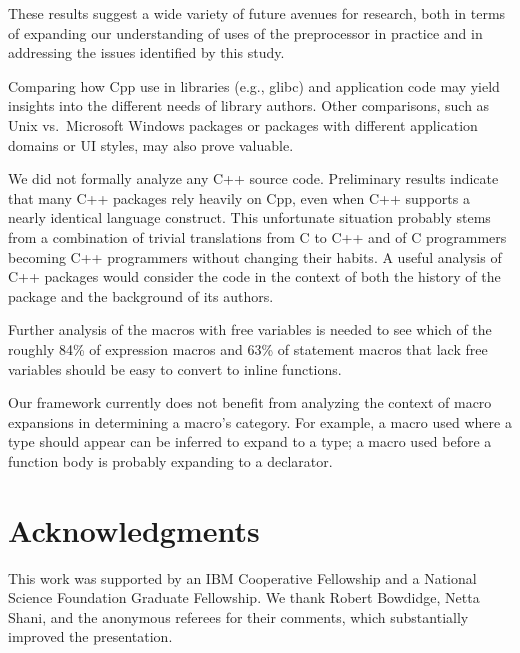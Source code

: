 \documentclass[10pt]{article}
\newcommand{\pkg}[1]{\textsf{#1}}
\begin{document}
 
These results suggest a wide variety of future avenues for research, both
in terms of expanding our understanding of uses of the preprocessor in
practice and in addressing the issues identified by this study.

Comparing how Cpp use in libraries (e.g., \pkg{glibc}) and application code
may yield insights into the different needs of library authors.  Other
comparisons, such as Unix vs.~Microsoft Windows packages or packages with
different application domains or UI styles, may also prove valuable.

We did not formally analyze any C++ source code.  Preliminary results
indicate that many C++ packages rely heavily on Cpp, even when C++ supports
a nearly identical language construct.  This unfortunate situation probably
stems from a combination of trivial translations from C to C++ and of C
programmers becoming C++ programmers without changing their habits.  A
useful analysis of C++ packages would consider the code in the context of
both the history of the package and the background of its authors.


Further analysis of the macros with free variables is needed to see which
of the roughly 84\% of expression macros and 63\% of statement macros that
lack free variables should be easy to convert to inline functions.

Our framework currently does not benefit from analyzing the context of
macro expansions in determining a macro's category.  For example, a
macro used where a type should appear can be inferred to expand to a
type; a macro used before a function body is probably expanding to a
declarator.


\section*{Acknowledgments}

This work was supported by an IBM Cooperative Fellowship and a National
Science Foundation Graduate Fellowship.  We thank Robert Bowdidge, Netta
Shani, and the anonymous referees for their comments, which substantially
improved the presentation.
    


{\small }
\end{document}

